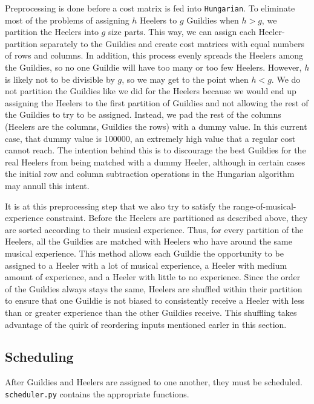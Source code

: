 \documentclass[letterpaper]{article}
\begin{document}
Preprocessing is done before a cost matrix is fed into \texttt{Hungarian}. To eliminate most of the problems of
assigning $h$ Heelers to $g$ Guildies when $h > g$, we partition the Heelers into $g$ size parts. This way, we can
assign each Heeler-partition separately to the Guildies and create cost matrices with equal numbers of rows and columns.
In addition, this process evenly spreads the Heelers among the Guildies, so no one Guildie will have too many or too few
Heelers.
However, $h$ is likely not to be divisible by $g$, so we may get to the point when $h < g$. We do not partition the
Guildies like we did for the Heelers because we would end up assigning the Heelers to the first partition of Guildies
and not allowing the rest of the Guildies to try to be assigned. Instead, we pad the rest of the columns (Heelers are
the columns, Guildies the rows) with a dummy value. In this current case, that dummy value is 100000, an extremely high
value that a regular cost cannot reach. The intention behind this is to discourage the best Guildies for the real Heelers
from being matched with a dummy Heeler, although in certain cases the initial row and column subtraction operations in
the Hungarian algorithm may annull this intent.

It is at this preprocessing step that we also try to satisfy the range-of-musical-experience constraint. Before the Heelers
are partitioned as described above, they are sorted according to their musical experience. Thus, for every partition of
the Heelers, all the Guildies are matched with Heelers who have around the same musical experience. This method allows
each Guildie the opportunity to be assigned to a Heeler with a lot of musical experience, a Heeler with medium amount of
experience, and a Heeler with little to no experience. Since the order of the Guildies always stays the same, Heelers
are shuffled within their partition to ensure that one Guildie is not biased to consistently receive a Heeler with less
than or greater experience than the other Guildies receive. This shuffling takes advantage of the quirk of reordering
inputs mentioned earler in this section.

\subsection{Scheduling}
After Guildies and Heelers are assigned to one another, they must be scheduled. \texttt{scheduler.py} contains the
appropriate functions.
\end{document}
